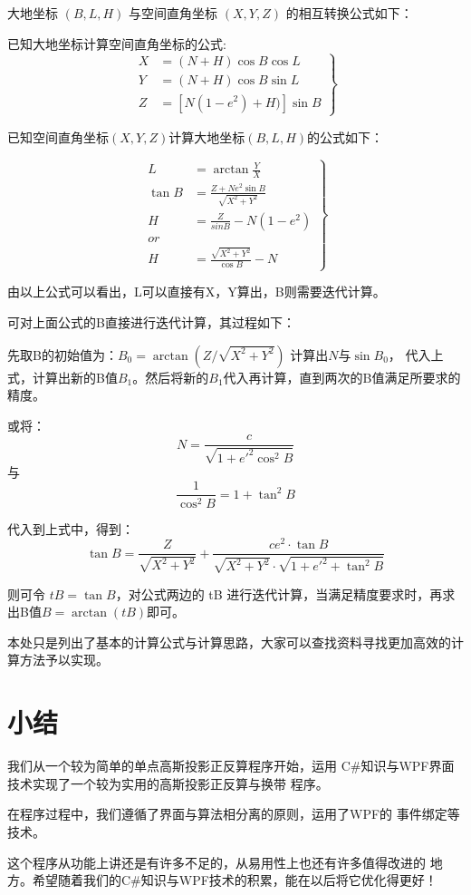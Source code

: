 大地坐标 $(B, L, H)$ 与空间直角坐标 $(X, Y, Z)$ 的相互转换公式如下：

已知大地坐标计算空间直角坐标的公式:
\begin{equation}
\left .
\begin{aligned}
X &= (N+H) \cos B \cos L \\
Y &= (N+H) \cos B \sin L \\
Z &= [N(1 - e^2) + H)] \sin B 
\end{aligned} 
\right \}
\end{equation}

已知空间直角坐标$(X,Y,Z)$计算大地坐标$(B, L, H)$的公式如下：

\begin{equation}
\left . 
\begin{aligned}
L &= \arctan \frac{Y}{X} \\
\tan B &= \frac{Z + Ne^2 \sin B}{\sqrt{X^2 + Y^2}} \\
H &= \frac{Z}{sinB} - N(1-e^2)  \\
 or  \\
H &=\frac{\sqrt{X^2 + Y^2}}{\cos B} - N 
\end{aligned} 
\right \}
\end{equation}

由以上公式可以看出，L可以直接有X，Y算出，B则需要迭代计算。

可对上面公式的B直接进行迭代计算，其过程如下：


先取B的初始值为：$B_0 =\arctan{ (Z / \sqrt{X^2 + Y^2} ) }$ 计算出$N$与$\sin B_0$，
代入上式，计算出新的B值$B_1$。然后将新的$B_1$代入再计算，直到两次的B值满足所要求的
精度。

或将：
$$N = \frac{c}{\sqrt{1+e'^2 \cos ^2 B}}$$
与$$\frac{1}{\cos^2 B} = 1+ \tan^2 B$$

代入到上式中，得到：
\begin{equation}
    \tan B = \frac{Z}{\sqrt{X^2 + Y^2}} + \frac{ce^2 \cdot \tan B}{\sqrt{X^2 + Y^2} \cdot \sqrt{1 + e'^2 + \tan^2 B}}
\end{equation}

则可令 $tB = \tan B$，对公式两边的 tB 进行迭代计算，当满足精度要求时，再求出B值$B=\arctan (tB)$即可。

本处只是列出了基本的计算公式与计算思路，大家可以查找资料寻找更加高效的计算方法予以实现。

\section*{小结}

我们从一个较为简单的单点高斯投影正反算程序开始，运用
C\#知识与WPF界面技术实现了一个较为实用的高斯投影正反算与换带
程序。

在程序过程中，我们遵循了界面与算法相分离的原则，运用了WPF的
事件绑定等技术。

这个程序从功能上讲还是有许多不足的，从易用性上也还有许多值得改进的
地方。希望随着我们的C\#知识与WPF技术的积累，能在以后将它优化得更好！
